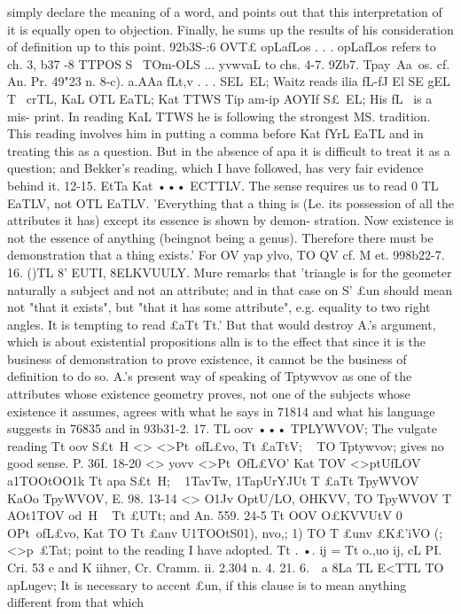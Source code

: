 {{{{{{{{{{{{{{{{{{{simply declare the meaning of a word, and points out that this
interpretation of it is equally open to objection. Finally, he sums
up the results of his consideration of definition up to this point.
92b3S-:6 OVT£ opLafLos . . . opLafLos refers to ch. 3, b37 -8 TTPOS S~
TOm-OLS ... yvwvaL to chs. 4-7.
9Zb7. Tpay~Aa~os. cf. An. Pr. 49"23 n.
8-c). a.AAa fLt,v . . . SEL~EL; Waitz reads ilia fL-fJ El SE {gEL T{
~crTL, KaL OTL EaTL; Kat TTWS Tip am-ip AOYIf S£~EL; His fL~ is a mis-
print. In reading KaL TTWS he is following the strongest MS.
tradition. This reading involves him in putting a comma before
Kat fYrL EaTL and in treating this as a question. But in the absence
of apa it is difficult to treat it as a question; and Bekker's reading,
which I have followed, has very fair evidence behind it.
12-15. EtTa Kat ••• ECTTLV. The sense requires us to read 0 TL
EaTLV, not OTL EaTLV. 'Everything that a thing is (Le. its possession
of all the attributes it has) except its essence is shown by demon-
stration. Now existence is not the essence of anything (beingnot being a genus). Therefore there must be demonstration that
a thing exists.' For OV yap ylvo, TO QV cf. M et. 998b22-7.
16. ()TL 8' EUTI, 8ELKVUULY. Mure remarks that 'triangle is for
the geometer naturally a subject and not an attribute; and in
that case on S' £un should mean not "that it exists", but "that
it has some attribute", e.g. equality to two right angles. It is
tempting to read £aTt Tt.' But that would destroy A.'s argument,
which is about existential propositions alln is to the effect that
since it is the business of demonstration to prove existence, it
cannot be the business of definition to do so. A.'s present way
of speaking of Tptywvov as one of the attributes whose existence
geometry proves, not one of the subjects whose existence it
assumes, agrees with what he says in 71814 and what his language
suggests in 76835 and in 93b31-2.
17. TL oov ••• TPLYWVOV; The vulgate reading Tt oov S£t~H <>
<>Pt~ofL£vo, Tt £aTtV; ~ TO Tptywvov; gives no good sense. P. 36I.
18-20 <> yovv <>Pt~OfL£VO' Kat TOV <>ptUfLOV a1TOOtOO1k Tt apa S£t~H; ~
1TavTw, 1Tap{UrYJUt T{ £aTt Tp{yWVOV KaOo Tp{yWVOV, E. 98. 13-14
<> O1Jv OptU/LO, OHKVV, TO Tp{yWVOV T{ AOt1TOV od~H ~ Tt £UTt; and An.
559. 24-5 Tt OOV O£{KVVUtV 0 OPt~ofL£vo, Kat TO Tt £anv U1TOOtS01),
nvo,; 1) TO T{ £unv £K£'iVO (; <>p{~£Tat; point to the reading I have
adopted. Tt . •. ij = Tt o.,uo ij, cL PI. Cri. 53 e and K iihner,
Cr. Cramm. ii. 2.304 n. 4.
21. 6.~~a 8La TL E<TTL TO apLugev; It is necessary to accent £un,
if this clause is to mean anything different from that which
}}}}}}}}}}}}}}}}}}}}}}}}}}}}}}

